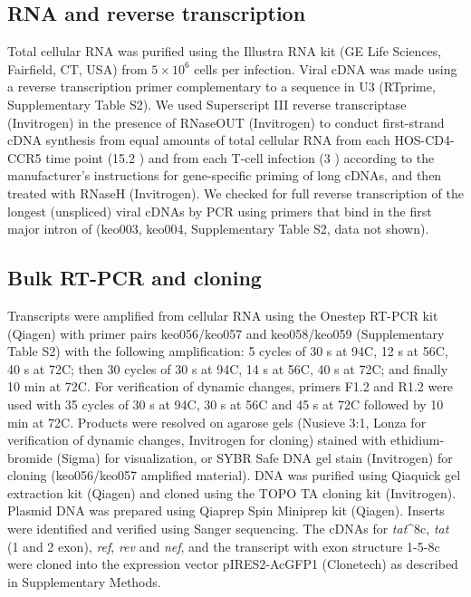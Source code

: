 \documentclass[../sherrill-Mix_thesis.tex]{subfiles}
\begin{document}
\subsection{RNA and reverse transcription}
Total cellular RNA was purified using the Illustra RNA kit (GE Life Sciences, Fairfield, CT, USA) from $5 \times 10^6$ cells per infection. Viral cDNA was made using a reverse transcription primer complementary to a sequence in U3 (RTprime, Supplementary Table S2). We used Superscript III reverse transcriptase (Invitrogen) in the presence of RNaseOUT (Invitrogen) to conduct first-strand cDNA synthesis from equal amounts of total cellular RNA from each HOS-CD4-CCR5 time point (15.2 \ug{}) and from each T-cell infection (3 \ug{}) according to the manufacturer's instructions for gene-specific priming of long cDNAs, and then treated with RNaseH (Invitrogen). We checked for full reverse transcription of the longest (unspliced) viral cDNAs by PCR using primers that bind in the first major intron of \hivEight{} (keo003, keo004, Supplementary Table S2, data not shown).

\subsection{Bulk RT-PCR and cloning}
Transcripts were amplified from cellular RNA using the Onestep RT-PCR kit (Qiagen) with primer pairs keo056/keo057 and keo058/keo059 (Supplementary Table S2) with the following amplification: 5 cycles of 30 s at 94\degree{}C, 12 s at 56\degree{}C, 40 s at 72\degree{}C; then 30 cycles of 30 s at 94\degree{}C, 14 s at 56\degree{}C, 40 s at 72\degree{}C; and finally 10 min at 72\degree{}C. For verification of dynamic changes, primers F1.2 and R1.2 were used with 35 cycles of 30 s at 94\degree{}C, 30 s at 56\degree{}C and 45 s at 72\degree{}C followed by 10 min at 72\degree{}C. Products were resolved on agarose gels (Nusieve 3:1, Lonza for verification of dynamic changes, Invitrogen for cloning) stained with ethidium-bromide (Sigma) for visualization, or SYBR Safe DNA gel stain (Invitrogen) for cloning (keo056/keo057 amplified material). DNA was purified using Qiaquick gel extraction kit (Qiagen) and cloned using the TOPO TA cloning kit (Invitrogen). Plasmid DNA was prepared using Qiaprep Spin Miniprep kit (Qiagen). Inserts were identified and verified using Sanger sequencing. The cDNAs for \textit{tat}\^{}8c, \textit{tat} (1 and 2 exon), \textit{ref}, \textit{rev} and \textit{nef}, and the transcript with exon structure 1-5-8c were cloned into the expression vector pIRES2-AcGFP1 (Clonetech) as described in Supplementary Methods. 
\end{document}
